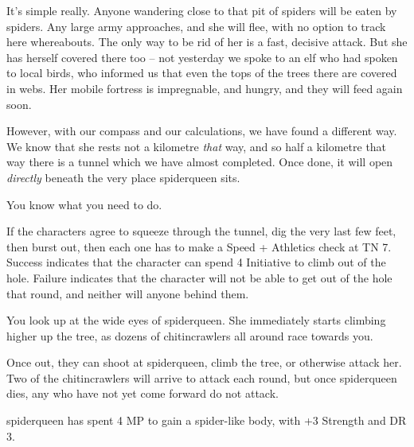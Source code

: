 \begin{multicols}{2}
\begin{speechtext}

  It's simple really.
  Anyone wandering close to that pit of spiders will be eaten by spiders.
  Any large army approaches, and she will flee, with no option to track here whereabouts.
  The only way to be rid of her is a fast, decisive attack.
  But she has herself covered there too -- not yesterday we spoke to an elf who had spoken to local birds, who informed us that even the tops of the trees there are covered in webs.
  Her mobile fortress is impregnable, and hungry, and they will feed again soon.

  However, with our compass and our calculations, we have found a different way.
  We know that she rests not a kilometre \emph{that} way, and so half a kilometre that way there is a tunnel which we have almost completed.
  Once done, it will open \emph{directly} beneath the very place \gls{spiderqueen} sits.

  You know what you need to do.

\end{speechtext}

If the characters agree to squeeze through the tunnel, dig the very last few feet, then burst out, then each one has to make a Speed + Athletics check at TN 7.
Success indicates that the character can spend 4 Initiative to climb out of the hole.
Failure indicates that the character will not be able to get out of the hole that round, and neither will anyone behind them.

\begin{boxtext}

  You look up at the wide eyes of \gls{spiderqueen}.
  She immediately starts climbing higher up the tree, as dozens of chitincrawlers all around race towards you.

\end{boxtext}

Once out, they can shoot at \gls{spiderqueen}, climb the tree, or otherwise attack her.
Two of the chitincrawlers will arrive to attack each round, but once \gls{spiderqueen} dies, any who have not yet come forward do not attack.

\keras



\spiderqueen

\Gls{spiderqueen} has spent 4 MP to gain a spider-like body, with +3 Strength and DR 3.


\end{multicols}
